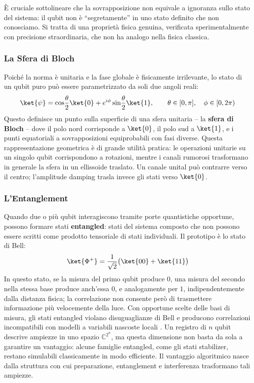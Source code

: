 \begin{onehalfspace}
È cruciale sottolineare che la sovrapposizione non equivale a ignoranza sullo stato del sistema: il qubit non è ``segretamente'' in uno stato definito che non conosciamo. Si tratta di una proprietà fisica genuina, verificata sperimentalmente con precisione straordinaria, che non ha analogo nella fisica classica.

\subsubsection{La Sfera di Bloch}

Poiché la norma è unitaria e la fase globale è fisicamente irrilevante, lo stato di un qubit puro può essere parametrizzato da soli due angoli reali:
\begin{equation}
    \ket{\psi} = \cos\!\frac{\theta}{2}\ket{0} + e^{i\phi}\sin\!\frac{\theta}{2}\ket{1}, \qquad \theta \in [0,\pi],\quad \phi \in [0,2\pi)
    \label{eq:bloch_parametrization}
\end{equation}
Questo definisce un punto sulla superficie di una sfera unitaria -- la \textbf{sfera di Bloch} -- dove il polo nord corrisponde a $\ket{0}$, il polo sud a $\ket{1}$, e i punti equatoriali a sovrapposizioni equiprobabili con fasi diverse. Questa rappresentazione geometrica è di grande utilità pratica: le operazioni unitarie su un singolo qubit corrispondono a rotazioni, mentre i canali rumorosi trasformano in generale la sfera in un ellissoide traslato. Un canale unital può contrarre verso il centro; l'amplitude damping trasla invece gli stati verso $\ket{0}$.

\subsubsection{L'Entanglement}

Quando due o più qubit interagiscono tramite porte quantistiche opportune, possono formare stati \textbf{entangled}: stati del sistema composto che non possono essere scritti come prodotto tensoriale di stati individuali. Il prototipo è lo stato di Bell:
\begin{equation}
    \ket{\Phi^+} = \frac{1}{\sqrt{2}}\bigl(\ket{00} + \ket{11}\bigr)
    \label{eq:bell_state}
\end{equation}
In questo stato, se la misura del primo qubit produce $0$, una misura del secondo nella stessa base produce anch'essa $0$, e analogamente per $1$, indipendentemente dalla distanza fisica; la correlazione non consente però di trasmettere informazione più velocemente della luce. Con opportune scelte delle basi di misura, gli stati entangled violano disuguaglianze di Bell e producono correlazioni incompatibili con modelli a variabili nascoste locali \cite{bell1964,aspect1982}. Un registro di $n$ qubit descrive ampiezze in uno spazio $\mathbb{C}^{2^n}$, ma questa dimensione non basta da sola a garantire un vantaggio: alcune famiglie entangled, come gli stati stabilizer, restano simulabili classicamente in modo efficiente. Il vantaggio algoritmico nasce dalla struttura con cui preparazione, entanglement e interferenza trasformano tali ampiezze.


\end{onehalfspace}
